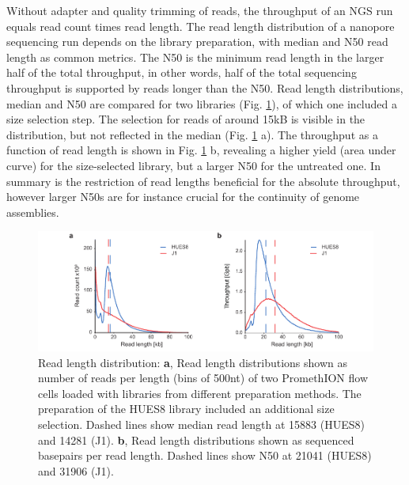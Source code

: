 Without adapter and quality trimming of reads, the throughput of an NGS run equals read count times read length.
The read length distribution of a nanopore sequencing run depends on the library preparation, with median and N50 read length as common metrics.
The N50 is the minimum read length in the larger half of the total throughput, in other words, half of the total sequencing throughput is supported by reads longer than the N50.
Read length distributions, median and N50 are compared for two libraries (Fig. \ref{fig:state_of_art:read_length}), of which one included a size selection step.
The selection for reads of around 15kB is visible in the distribution, but not reflected in the median (Fig. \ref{fig:state_of_art:read_length} a).
The throughput as a function of read length is shown in Fig. \ref{fig:state_of_art:read_length} b, revealing a higher yield (area under curve) for the size-selected library, but a larger N50 for the untreated one.
In summary is the restriction of read lengths beneficial for the absolute throughput, however larger N50s are for instance crucial for the continuity of genome assemblies.

\begin{figure}[h]
    \centering
    \includegraphics[width=1.0\textwidth]{figures/state_of_art/read_length.pdf}
    \captionsetup{format=plain}
    \caption[Read length median and N50]{Read length distribution: \textbf{a}, Read length distributions shown as number of reads per length (bins of 500nt) of two PromethION flow cells loaded with libraries from different preparation methods. The preparation of the HUES8 library included an additional size selection. Dashed lines show median read length at 15883 (HUES8) and 14281 (J1). \textbf{b}, Read length distributions shown as sequenced basepairs per read length. Dashed lines show N50 at 21041 (HUES8) and 31906 (J1).}
    \label{fig:state_of_art:read_length}
\end{figure}


